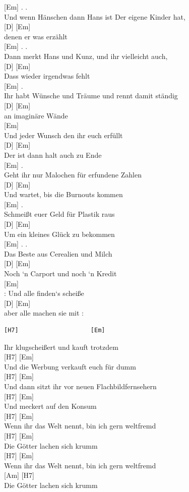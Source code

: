 \documentclass[
  letterpaper,
]{scrbook}
\begin{document}
{[}Em{]} . .\\
Und wenn Hänschen dann Hans ist Der eigene Kinder hat,\\
{[}D{]} {[}Em{]}\\
denen er was erzählt\\
{[}Em{]} . .\\
Dann merkt Hans und Kunz, und ihr vielleicht auch,\\
{[}D{]} {[}Em{]}\\
Dass wieder irgendwas fehlt\\
{[}Em{]} .\\
Ihr habt Wünsche und Träume und rennt damit ständig\\
{[}D{]} {[}Em{]}\\
an imaginäre Wände\\
{[}Em{]}\\
Und jeder Wunsch den ihr euch erfüllt\\
{[}D{]} {[}Em{]}\\
Der ist dann halt auch zu Ende\\
{[}Em{]} .\\
Geht ihr nur Malochen für erfundene Zahlen\\
{[}D{]} {[}Em{]}\\
Und wartet, bis die Burnouts kommen\\
{[}Em{]} .\\
Schmeißt euer Geld für Plastik raus\\
{[}D{]} {[}Em{]}\\
Um ein kleines Glück zu bekommen\\
{[}Em{]} . .\\
Das Beste aus Cerealien und Milch\\
{[}D{]} {[}Em{]}\\
Noch `n Carport und noch `n Kredit\\
{[}Em{]}\\
\textbar: Und alle finden`s scheiße\\
{[}D{]} {[}Em{]}\\
aber alle machen sie mit :\textbar{}

\begin{verbatim}
[H7]                    [Em]
\end{verbatim}

Ihr klugscheißert und kauft trotzdem\\
{[}H7{]} {[}Em{]}\\
Und die Werbung verkauft euch für dumm\\
{[}H7{]} {[}Em{]}\\
Und dann sitzt ihr vor neuen Flachbildfernsehern\\
{[}H7{]} {[}Em{]}\\
Und meckert auf den Konsum\\
{[}H7{]} {[}Em{]}\\
Wenn ihr das Welt nennt, bin ich gern weltfremd\\
{[}H7{]} {[}Em{]}\\
Die Götter lachen sich krumm\\
{[}H7{]} {[}Em{]}\\
Wenn ihr das Welt nennt, bin ich gern weltfremd\\
{[}Am{]} {[}H7{]}\\
Die Götter lachen sich krumm
\end{document}
